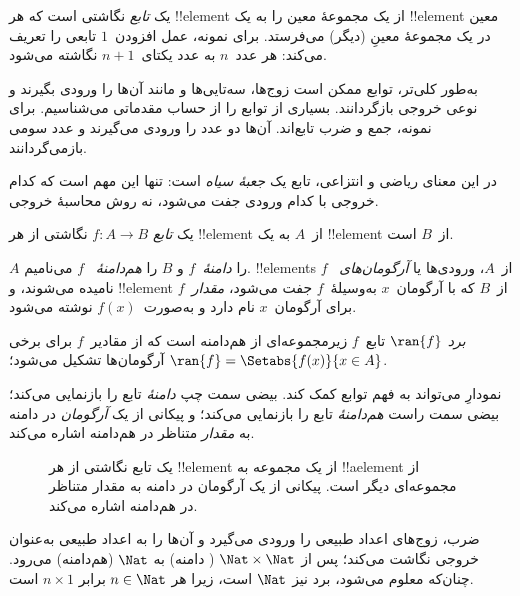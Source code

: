 \documentclass[../../../include/open-logic-section]{subfiles}
\begin{document}

\begin{explain}
یک \emph{تابع} نگاشتی است که هر !!{element} از یک مجموعهٔ معین را
به یک !!{element} معین در یک مجموعهٔ معینِ (دیگر) می‌فرستد. برای نمونه،
عمل افزودن~$1$ تابعی را تعریف می‌کند: هر عدد~$n$ به
عدد یکتای~$n+1$ نگاشته می‌شود.

به‌طور کلی‌تر، توابع ممکن است زوج‌ها، سه‌تایی‌ها و مانند آن‌ها را ورودی بگیرند و
نوعی خروجی بازگردانند. بسیاری از توابع را از
حساب مقدماتی می‌شناسیم. برای نمونه، جمع و ضرب
تابع‌اند. آن‌ها دو عدد را ورودی می‌گیرند و عدد سومی بازمی‌گردانند.

در این معنای ریاضی و انتزاعی، تابع یک \emph{جعبهٔ
سیاه} است: تنها این مهم است که کدام خروجی با کدام ورودی جفت می‌شود، نه
روش محاسبهٔ خروجی.
\end{explain}

\begin{defn}[تابع]
یک \emph{تابع} $f \colon A \to B$ نگاشتی از هر !!{element}
از~$A$ به یک !!{element} از~$B$ است.

$A$ را \emph{دامنهٔ}~$f$ و $B$ را \emph{هم‌دامنهٔ}
~$f$ می‌نامیم. !!{element}s از~$A$، ورودی‌ها یا \emph{آرگومان‌های}
~$f$ نامیده می‌شوند، و !!{element} از~$B$ که با آرگومان~$x$
به‌وسیلهٔ~$f$ جفت می‌شود، \emph{مقدار~$f$} برای آرگومان~$x$ نام دارد و
به‌صورت~$f(x)$ نوشته می‌شود.

\emph{برد} $\ran{f}$ تابع~$f$ زیرمجموعه‌ای از هم‌دامنه است
که از مقادیر~$f$ برای برخی آرگومان‌ها تشکیل می‌شود؛ $\ran{f} =
\Setabs{f(x)}{x \in A}$.
\end{defn}

نمودارِ  می‌تواند به فهم توابع کمک کند. بیضی
سمت چپ \emph{دامنهٔ} تابع را بازنمایی می‌کند؛ بیضی سمت
راست \emph{هم‌دامنهٔ} تابع را بازنمایی می‌کند؛ و پیکانی
از یک \emph{آرگومان} در دامنه به
\emph{مقدار} متناظر در هم‌دامنه اشاره می‌کند.

\begin{figure}
  \caption{یک تابع نگاشتی از هر !!{element} از یک مجموعه به
    !!a{element} از مجموعه‌ای دیگر است. پیکانی از یک آرگومان در
    دامنه به مقدار متناظر در هم‌دامنه اشاره می‌کند.}
\end{figure}

\begin{ex}
ضرب، زوج‌های اعداد طبیعی را ورودی می‌گیرد و آن‌ها را
به اعداد طبیعی به‌عنوان خروجی نگاشت می‌کند؛ پس از $\Nat \times \Nat$ (
دامنه) به $\Nat$ (هم‌دامنه) می‌رود. چنان‌که معلوم می‌شود، برد نیز
$\Nat$ است، زیرا هر $n \in \Nat$ برابر $n \times 1$ است.
\end{ex}
\end{document}
